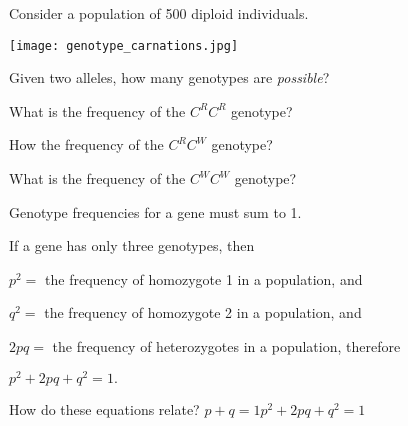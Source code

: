 \documentclass[t,handout]{beamer}  %
\begin{document}
\begin{frame}{Consider a population of 500 diploid individuals.}

	\vspace{-\baselineskip}
	\begin{center}
		\texttt{[image: genotype\_carnations.jpg]}
	\end{center}

	\vspace{-\baselineskip}
	\hangpara Given two alleles, how many genotypes are \textit{possible}?
	\pause
		
	\hangpara What is the frequency of the $C^RC^R$ genotype?
	\pause

	\hangpara How the frequency of the $C^RC^W$ genotype?
	\pause

	\hangpara What is the frequency of the $C^WC^W$ genotype?
	
\end{frame}

\begin{frame}{Genotype frequencies for a gene must sum to 1.}

	\hangpara If a gene has only three genotypes, then

	\hangpara $p^2=$ the frequency of homozygote 1 in a population, and
	\pause
		
	\hangpara $q^2=$ the frequency of homozygote 2 in a population, and
	\pause

	\hangpara $2pq=$ the frequency of heterozygotes in a population, therefore
	\pause
	 
	\hangpara $p^2 + 2pq + q^2=1.$

	\vspace{\baselineskip}
	\hangpara {}
\end{frame}

\begin{frame}{How do these equations relate?}
	\vspace{\baselineskip}
	\centering
	\hspace{6em}$p+q=1$\hfill$p^2 + 2pq + q^2=1$\hspace{6em}
	
\end{frame}
\end{document}
